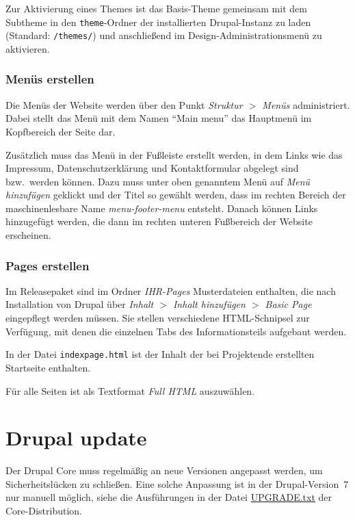 \documentclass[a4paper,11pt,twoside]{article}
\begin{document}
Zur Aktivierung eines Themes ist das Basis-Theme gemeinsam mit dem Subtheme in
den \texttt{theme}-Ordner der installierten Drupal-Instanz zu laden (Standard:
\texttt{/themes/}) und anschließend im Design-Administrationsmenü zu
aktivieren.

\subsubsection{Menüs erstellen}
Die Menüs der Website werden über den Punkt \textit{Struktur $>$ Menüs}
administriert. Dabei stellt das Menü mit dem Namen "`Main menu"' das Hauptmenü
im Kopfbereich der Seite dar.

Zusätzlich muss das Menü in der Fußleiste erstellt werden, in dem Links wie
das Impressum, Datenschutzerklärung und Kontaktformular abgelegt sind
bzw.\ werden können.  Dazu muss unter oben genanntem Menü auf \emph{Menü
  hinzufügen} geklickt und der Titel so gewählt werden, dass im rechten
Bereich der maschinenlesbare Name \textit{menu-footer-menu} entsteht. Danach
können Links hinzugefügt werden, die dann im rechten unteren Fußbereich der
Website erscheinen.

\subsubsection{Pages erstellen}
Im Releasepaket sind im Ordner \emph{IHR-Pages} Musterdateien enthalten, die
nach Installation von Drupal über \textit{Inhalt $>$ Inhalt hinzufügen $>$
  Basic Page} eingepflegt werden müssen. Sie stellen verschiedene
HTML-Schnipsel zur Verfügung, mit denen die einzelnen Tabs des
Informationsteils aufgebaut werden.

In der Datei \texttt{indexpage.html} ist der Inhalt der bei Projektende
erstellten Startseite enthalten. 

Für alle Seiten ist als Textformat \emph{Full HTML} auszuwählen.

\section{Drupal update}

Der Drupal Core muss regelmäßig an neue Versionen angepasst werden, um
Sicherheitslücken zu schließen. Eine solche Anpassung ist in der
Drupal-Version~7 nur manuell möglich, siehe die Ausführungen in der Datei
\url{UPGRADE.txt} der Core-Distribution.
\end{document}
